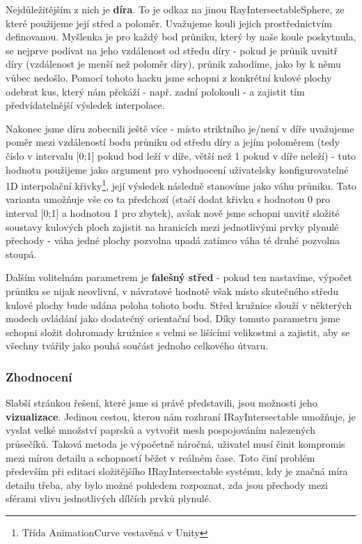 Nejdůležitějším z nich je \textbf{díra}. To je odkaz na jinou RayIntersectableSphere, ze které použijeme její střed a poloměr. Uvažujeme kouli jejich prostřednictvím definovanou. Myšlenka je pro každý bod průniku, který by naše koule poskytnula, se nejprve podívat na jeho vzdálenost od středu díry - pokud je průnik uvnitř díry (vzdálenost je menší než poloměr díry), průnik zahodíme, jako by k němu vůbec nedošlo. Pomocí tohoto hacku jsme schopni z konkrétní kulové plochy odebrat kus, který nám překáží - např. zadní polokouli - a zajistit tím předvídatelnější výsledek interpolace.

Nakonec jsme díru zobecnili ještě více - místo striktního je/není v díře uvažujeme poměr mezi vzdáleností bodu průniku od středu díry a jejím poloměrem (tedy číslo v intervalu [0;1] pokud bod leží v díře, větší než 1 pokud v díře neleží) - tuto hodnotu použijeme jako argument pro vyhodnocení uživatelsky konfigurovatelné 1D interpolační křivky\footnote{Třída AnimationCurve vestavěná v Unity}, její výsledek následně stanovíme jako váhu průniku. Tato varianta umožňuje vše co ta předchozí (stačí dodat křivku s hodnotou 0 pro interval [0;1] a hodnotou 1 pro zbytek), avšak nově jsme schopni unvitř složité soustavy kulových ploch zajistit na hranicích mezi jednotlivými prvky plynulé přechody - váha jedné plochy pozvolna upadá zatímco váha té druhé pozvolna stoupá.

Dalším volitelnám parametrem je \textbf{falešný střed} - pokud ten nastavíme, výpočet průniku se nijak neovlivní, v návratové hodnotě však místo skutečného středu kulové plochy bude udána poloha tohoto bodu. Střed kružnice slouží v některých modech ovládání jako dodatečný orientační bod. Díky tomuto parametru jsme schopni složit dohromady kružnice s velmi se lišícími velikostmi a zajistit, aby se všechny tvářily jako pouhá součást jednoho celkového útvaru. 


\subsubsection*{Zhodnocení}

Slabší stránkou řešení, které jsme si právě představili, jsou možnosti jeho \textbf{vizualizace}. Jedinou cestou, kterou nám rozhraní IRayIntersectable umožňuje, je vyslat velké množství paprsků a vytvořit mesh pospojováním nalezených průsečíků. Taková metoda je výpočetně náročná, uživatel musí činit kompromis mezi mírou detailu a schopností běžet v reálném čase. Toto činí problém především při editaci složitějšího IRayIntersectable systému, kdy je značná míra detailu třeba, aby bylo možné pohledem rozpoznat, zda jsou přechody mezi sférami vlivu jednotlivých dílčích prvků plynulé. 

